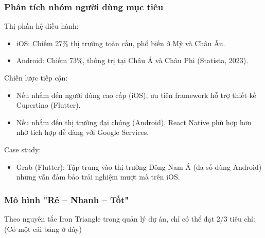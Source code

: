     \begin{flushleft}
      \subsubsection{Phân tích nhóm người dùng mục tiêu}
        \begin{flushleft}
          \hspace*{0.8cm}Thị phần hệ điều hành:
          \setlength{\leftmargini}{1.5cm}
          \begin{itemize}
            \item iOS: Chiếm 27\% thị trường toàn cầu, phổ biến ở Mỹ và Châu Âu.
            \item Android: Chiếm 73\%, thống trị tại Châu Á và Châu Phi (Statista, 2023).
          \end{itemize}
        \end{flushleft}

        \begin{flushleft}
          \hspace*{0.8cm}Chiến lược tiếp cận:
          \setlength{\leftmargini}{1.5cm}
          \begin{itemize}
              \item Nếu nhắm đến người dùng cao cấp (iOS), ưu tiên framework hỗ trợ thiết kế Cupertino (Flutter).
              \item Nếu nhắm đến thị trường đại chúng (Android), React Native phù hợp hơn nhờ tích hợp dễ dàng với Google Services.
          \end{itemize}
        \end{flushleft}

        \begin{flushleft}
          \hspace*{0.8cm}Case study:
          \setlength{\leftmargini}{1.5cm}
          \begin{itemize}
              \item Grab (Flutter): Tập trung vào thị trường Đông Nam Á (đa số dùng Android) nhưng vẫn đảm bảo trải nghiệm mượt mà trên iOS.
          \end{itemize}
        \end{flushleft}

      \subsubsection{Mô hình "Rẻ – Nhanh – Tốt"}
        \begin{flushleft}
          \hspace*{0.8cm}Theo nguyên tắc Iron Triangle trong quản lý dự án, chỉ có thể đạt 2/3 tiêu chí: (Có một cái bảng ở đây)
        \end{flushleft}


\end{flushleft}
